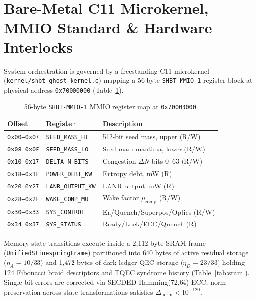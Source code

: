 \documentclass[twocolumn,aps,pra,floatfix,superscriptaddress,10pt]{revtex4-2}
\begin{document}
\section{Bare-Metal C11 Microkernel, MMIO Standard \& Hardware Interlocks}

System orchestration is governed by a freestanding C11 microkernel (\texttt{kernel/shbt\_ghost\_kernel.c}) mapping a 56-byte \texttt{SHBT-MMIO-1} register block at physical address \texttt{0x70000000} (Table~\ref{tab:mmio}).

\begin{table}[!ht]
\caption{\label{tab:mmio}56-byte \texttt{SHBT-MMIO-1} MMIO register map at \texttt{0x70000000}.}
\scriptsize
\begin{ruledtabular}
\begin{tabular}{lll}
Offset & Register & Description \\
\hline
\texttt{0x00--0x07} & \texttt{SEED\_MASS\_HI} & 512-bit seed mass, upper (R/W) \\
\texttt{0x08--0x0F} & \texttt{SEED\_MASS\_LO} & Seed mass mantissa, lower (R/W) \\
\texttt{0x10--0x17} & \texttt{DELTA\_N\_BITS} & Congestion $\Delta N$ bits 0--63 (R/W) \\
\texttt{0x18--0x1F} & \texttt{POWER\_DEBT\_KW} & Entropy debt, mW (R) \\
\texttt{0x20--0x27} & \texttt{LANR\_OUTPUT\_KW} & LANR output, mW (R) \\
\texttt{0x28--0x2F} & \texttt{WAKE\_COMP\_MU} & Wake factor $\mu_{\text{comp}}$ (R/W) \\
\texttt{0x30--0x33} & \texttt{SYS\_CONTROL} & En/Quench/Superpos/Optics (R/W) \\
\texttt{0x34--0x37} & \texttt{SYS\_STATUS} & Ready/Lock/ECC/Quench (R) \\
\end{tabular}
\end{ruledtabular}
\end{table}

Memory state transitions execute inside a 2,112-byte SRAM frame (\texttt{UnifiedStinespringFrame}) partitioned into 640 bytes of active residual storage ($\eta_A = 10/33$) and 1,472 bytes of dark ledger QEC storage ($\eta_D = 23/33$) holding 124 Fibonacci braid descriptors and TQEC syndrome history (Table~\ref{tab:sram}). Single-bit errors are corrected via SECDED Hamming(72,64) ECC; norm preservation across state transformations satisfies $\Delta_{\text{norm}} < 10^{-120}$.
\end{document}
